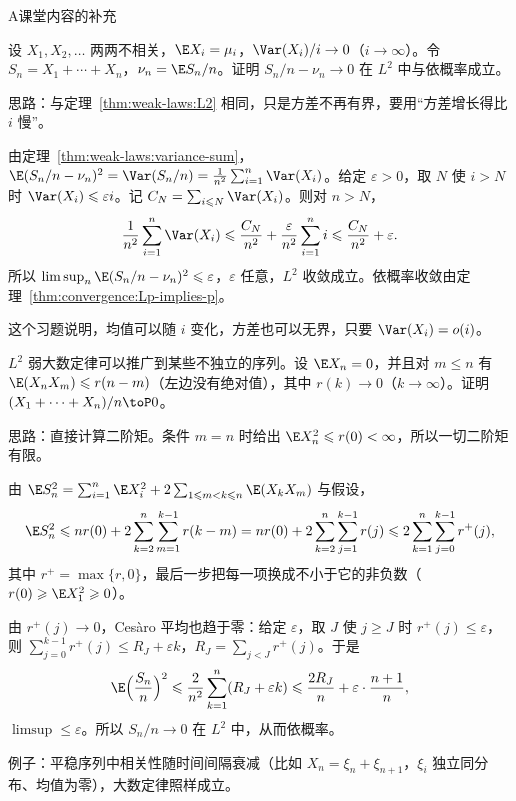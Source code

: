 \begin{exercises}{A}{课堂内容的补充}
\item\label{ex:weak-laws:A1} 设 $X_1,X_2,\dots$ 两两不相关，$\E X_i=\mu_i$，$\Var(X_i)/i\to0$（$i\to\infty$）。令 $S_n=X_1+\cdots+X_n$，$\nu_n=\E S_n/n$。证明 $S_n/n-\nu_n\to0$ 在 $L^2$ 中与依概率成立。
\begin{solution}
思路：与定理~\ref{thm:weak-laws:L2} 相同，只是方差不再有界，要用“方差增长得比 $i$ 慢”。

由定理~\ref{thm:weak-laws:variance-sum}，$\E(S_n/n-\nu_n)^2=\Var(S_n/n)=\frac1{n^2}\sum_{i=1}^n\Var(X_i)$。给定 $\varepsilon>0$，取 $N$ 使 $i>N$ 时 $\Var(X_i)\leqslant\varepsilon i$。记 $C_N=\sum_{i\leqslant N}\Var(X_i)$。则对 $n>N$，
\[
\frac1{n^2}\sum_{i=1}^n\Var(X_i)\leqslant\frac{C_N}{n^2}+\frac\varepsilon{n^2}\sum_{i=1}^ni\leqslant\frac{C_N}{n^2}+\varepsilon .
\]
所以 $\limsup_n\E(S_n/n-\nu_n)^2\leqslant\varepsilon$，$\varepsilon$ 任意，$L^2$ 收敛成立。依概率收敛由定理~\ref{thm:convergence:Lp-implies-p}。

这个习题说明，均值可以随 $i$ 变化，方差也可以无界，只要 $\Var(X_i)=o(i)$。
\end{solution}

\item\label{ex:weak-laws:A2} $L^2$ 弱大数定律可以推广到某些不独立的序列。设 $\E X_n=0$，并且对 $m\leqslant n$ 有 $\E(X_nX_m)\leqslant r(n-m)$（左边没有绝对值），其中 $r(k)\to0$（$k\to\infty$）。证明 $(X_1+\cdots+X_n)/n\toP0$。
\begin{solution}
思路：直接计算二阶矩。条件 $m=n$ 时给出 $\E X_n^2\leqslant r(0)<\infty$，所以一切二阶矩有限。

由 $\E S_n^2=\sum_{i=1}^n\E X_i^2+2\sum_{1\leqslant m<k\leqslant n}\E(X_kX_m)$ 与假设，
\[
\E S_n^2\leqslant nr(0)+2\sum_{k=2}^n\sum_{m=1}^{k-1}r(k-m)=nr(0)+2\sum_{k=2}^n\sum_{j=1}^{k-1}r(j)\leqslant2\sum_{k=1}^n\sum_{j=0}^{k-1}r^+(j),
\]
其中 $r^+=\max\{r,0\}$，最后一步把每一项换成不小于它的非负数（$r(0)\geqslant \E X_1^2\geqslant0$）。

由 $r^+(j)\to0$，Cesàro 平均也趋于零：给定 $\varepsilon$，取 $J$ 使 $j\geqslant J$ 时 $r^+(j)\leqslant\varepsilon$，则 $\sum_{j=0}^{k-1}r^+(j)\leqslant R_J+\varepsilon k$，$R_J=\sum_{j<J}r^+(j)$。于是
\[
\E\Bigl(\frac{S_n}n\Bigr)^2\leqslant\frac2{n^2}\sum_{k=1}^n(R_J+\varepsilon k)\leqslant\frac{2R_J}n+\varepsilon\cdot\frac{n+1}n,
\]
$\limsup\leqslant\varepsilon$。所以 $S_n/n\to0$ 在 $L^2$ 中，从而依概率。

例子：平稳序列中相关性随时间间隔衰减（比如 $X_n=\xi_n+\xi_{n+1}$，$\xi_i$ 独立同分布、均值为零），大数定律照样成立。
\end{solution}


\end{exercises}
